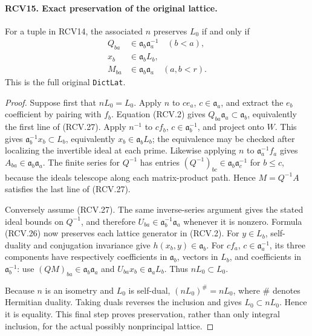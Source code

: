 \paragraph{RCV15. Exact preservation of the original lattice.}
\label{claim:RCV15}
For a tuple in RCV14, the associated \(n\) preserves \(L_0\)
if and only if
\[
 \begin{split}
 Q_{ba}&\in\mathfrak a_b\mathfrak a_a^{-1}\quad(b<a),\\
 x_b&\in\mathfrak a_b L_b,\\
 M_{ba}&\in\mathfrak a_b\mathfrak a_a\quad(a,b<r).
 \end{split}
\tag{RCV.27}
\]
This is the full original \texttt{DictLat}.
\begin{proof}
Suppose first that \(nL_0=L_0\).  Apply \(n\) to
\(c e_a\), \(c\in\mathfrak a_a\), and extract the \(e_b\)
coefficient by pairing with \(f_b\).  Equation (RCV.2) gives
\(Q_{ba}\mathfrak a_a\subset\mathfrak a_b\), equivalently
the first line of (RCV.27).  Apply \(n^{-1}\) to
\(c f_b\), \(c\in\mathfrak a_b^{-1}\), and project onto
\(W\).  This gives \(\mathfrak a_b^{-1}x_b\subset L_b\),
equivalently \(x_b\in\mathfrak a_bL_b\); the equivalence may
be checked after localizing the invertible ideal at each prime.
Likewise applying \(n\) to \(\mathfrak a_a^{-1}f_a\)
gives \(A_{ba}\in\mathfrak a_b\mathfrak a_a\).
The finite series for \(Q^{-1}\) has entries
\((Q^{-1})_{bc}\in\mathfrak a_b\mathfrak a_c^{-1}\)
for \(b\leq c\), because the ideals telescope along each
matrix-product path.  Hence \(M=Q^{-1}A\) satisfies the last
line of (RCV.27).

Conversely assume (RCV.27).  The same inverse-series argument
gives the stated ideal bounds on \(Q^{-1}\), and therefore
\(U_{ba}\in\mathfrak a_b^{-1}\mathfrak a_a\) whenever it
is nonzero.  Formula (RCV.26) now preserves each lattice generator
in (RCV.2).  For \(y\in L_b\), self-duality and conjugation
invariance give \(h(x_b,y)\in\mathfrak a_b\).
For \(c f_a\), \(c\in\mathfrak a_a^{-1}\), its three
components have respectively coefficients in \(\mathfrak a_b\),
vectors in \(L_b\), and coefficients in \(\mathfrak a_b^{-1}\):
use \((QM)_{ba}\in\mathfrak a_b\mathfrak a_a\) and
\(U_{ba}x_b\in\mathfrak a_aL_b\).  Thus \(nL_0\subset L_0\).

Because \(n\) is an isometry and \(L_0\) is self-dual,
\((nL_0)^{\#}=nL_0\), where \(\#\) denotes Hermitian
duality.  Taking duals reverses the inclusion and gives
\(L_0\subset nL_0\).  Hence it is equality.  This final step
proves preservation, rather than only integral inclusion, for the
actual possibly nonprincipal lattice.
\end{proof}

